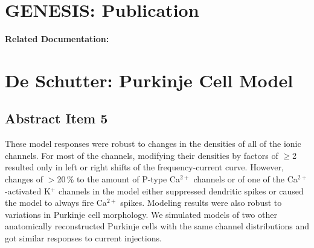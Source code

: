 \documentclass[12pt]{article}
\begin{document}
\section*{GENESIS: Publication}

{\bf Related Documentation:}

\section*{De Schutter: Purkinje Cell Model}

\subsection*{Abstract Item 5}

These model responses were robust to changes in the densities
of all of the ionic channels. For most of the channels, modifying
their densities by factors of $\geq$2 resulted only in left or right
shifts of the frequency-current curve. However, changes of $>$20\,\%
to the amount of P-type Ca$^{2+}$ channels or of one of the Ca$^{2+}$-activated
K$^+$ channels in the model either suppressed dendritic spikes
or caused the model to always fire Ca$^{2+}$ spikes. Modeling results
were also robust to variations in Purkinje cell morphology. We
simulated models of two other anatomically reconstructed Purkinje
cells with the same channel distributions and got similar
responses to current injections.
\end{document}
